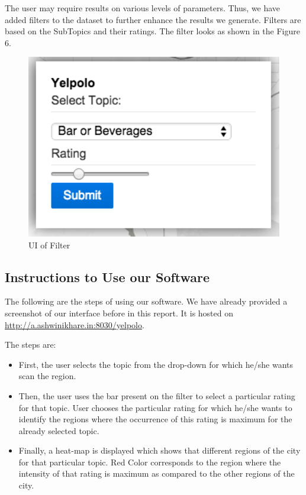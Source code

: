 \documentclass[12pt]{article} %
\begin{document}
The user may require results on various levels of parameters. Thus, we have added filters to the dataset to further enhance the results we generate. Filters are based on the SubTopics and their ratings. The filter looks as shown in the Figure 6.

\begin{figure}[h]
\begin{center}
\includegraphics[width=4.8in]{filter.png}
\caption{UI of Filter}
\end{center}
\end{figure}

\subsection{Instructions to Use our Software}

The following are the steps of using our software. We have already provided a screenshot of our interface before in this report. It is hosted on \href{http://a.ashwinikhare.in:8030/yelpolo}{http://a.ashwinikhare.in:8030/yelpolo}.

The steps are:

\begin{itemize}
\item First, the user selects the topic from the drop-down for which he/she wants scan the region.
\item Then, the user uses the bar present on the filter to select a particular rating for that topic. User chooses the particular rating for which he/she wants to identify the regions where the occurrence of this rating is maximum for the already selected topic.
\item Finally, a heat-map is displayed which shows that different regions of the city for that particular topic. Red Color corresponds to the region where the intensity of that rating is maximum as compared to the other regions of the city.
\end{itemize}
\end{document}
